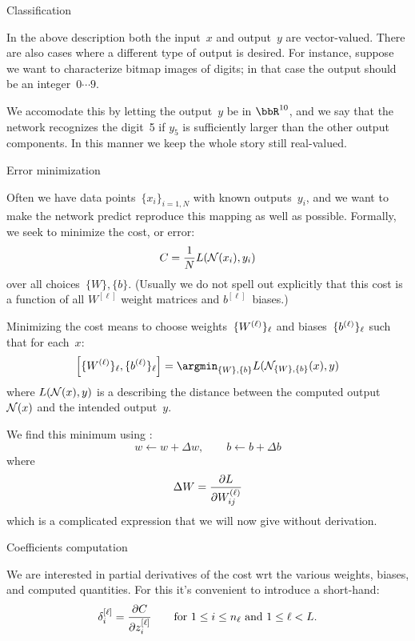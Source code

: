

 {Classification}

In the above description both the input~$x$ and output~$y$ are vector-valued.
There are also cases where a different type of output is desired.
For instance, suppose we want to characterize bitmap images of digits;
in that case the output should be an integer~$0\cdots 9$.

We accomodate this by letting the output~$y$ be in $\bbR^{10}$,
and we say that the network recognizes the digit~5
if $y_5$ is sufficiently larger than the other output components.
In this manner we keep the whole story still real-valued.

 {Error minimization}

Often we have data points~$\{x_i\}_{i=1,N}$ with known outputs~$y_i$,
and we want to make the network predict reproduce this mapping
as well as possible.
Formally,
we seek to minimize the cost, or error:
\[ C=\frac{1}{N} L({\cal N}(x_i),y_i) \]
over all choices~${ \{W\},\{b\} }$.
(Usually we do not spell out explicitly that this cost is a function of all $W^{[\ell]}$
weight matrices and $b^{[\ell]}$~biases.)


Minimizing the cost means to choose
weights~$\{W^{(\ell)}\}_\ell$
and biases~$\{b^{(\ell)}\}_\ell$ such that for each~$x$:
\begin{equation}
  \left[ \{W\supell\}_\ell,\{b\supell\}_\ell \right]
  = \argmin_{ \{W\},\{b\} } L ( \calN _{ \{W\},\{b\} }( x ),y ) 
\end{equation}
where $L({\cal N} (x),y)$ is a 
describing the distance between the computed output~${\cal N} (x)$
and the intended output~$y$.

We find this minimum using :
\[ w\leftarrow w+\Delta w, \qquad b\leftarrow b+\Delta b\]
where
\[ \Delta W = \frac{\partial L}{\partial W^{(\ell)}_{ij}} \]
which is a complicated expression that we will now give without derivation.

 {Coefficients computation}

We are interested in partial derivatives of the cost wrt the various weights,
biases, and computed quantities. For this it's convenient
to introduce a short-hand:
\begin{equation}
  \delta^{[\ell]}_i = \frac{ \partial C}{\partial z^{[\ell]}_i}
  \qquad \hbox{for $1\leq i\leq n_\ell$ and $1\leq \ell< L$}.
\end{equation}

